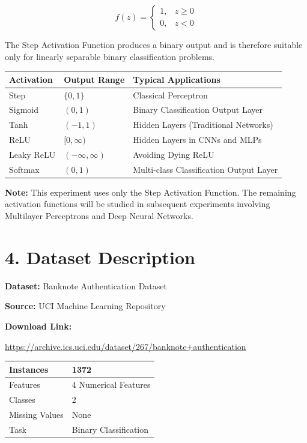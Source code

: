 \documentclass[11pt]{article}
\begin{document}
\[
f(z)=
\begin{cases}
1,&z\ge0\\
0,&z<0
\end{cases}
\]

The Step Activation Function produces a binary output and is therefore suitable only for linearly separable binary classification problems.

\begin{center}
\begin{tabular}{|p{2.5cm}|p{3cm}|p{6cm}|}
\hline
\textbf{Activation} & \textbf{Output Range} & \textbf{Typical Applications}\\
\hline
Step & $\{0,1\}$ & Classical Perceptron\\
\hline
Sigmoid & $(0,1)$ & Binary Classification Output Layer\\
\hline
Tanh & $(-1,1)$ & Hidden Layers (Traditional Networks)\\
\hline
ReLU & $[0,\infty)$ & Hidden Layers in CNNs and MLPs\\
\hline
Leaky ReLU & $(-\infty,\infty)$ & Avoiding Dying ReLU\\
\hline
Softmax & $(0,1)$ & Multi-class Classification Output Layer\\
\hline
\end{tabular}
\end{center}

\textbf{Note:} This experiment uses only the Step Activation Function. The remaining activation functions will be studied in subsequent experiments involving Multilayer Perceptrons and Deep Neural Networks.


\section*{4. Dataset Description}

\textbf{Dataset:} Banknote Authentication Dataset

\textbf{Source:} UCI Machine Learning Repository

\textbf{Download Link:}

\url{https://archive.ics.uci.edu/dataset/267/banknote+authentication}

\begin{center}
\begin{tabular}{|l|l|}
\hline
Instances & 1372\\
\hline
Features & 4 Numerical Features\\
\hline
Classes & 2\\
\hline
Missing Values & None\\
\hline
Task & Binary Classification\\
\hline
\end{tabular}
\end{center}
\end{document}
